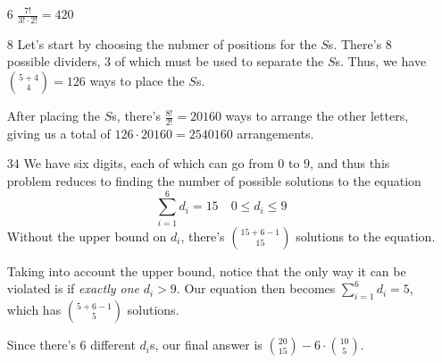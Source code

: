 \documentclass[12pt]{article}
\begin{document}
\begin{enumerate}
    \item[6] $\frac{7!}{3! \cdot 2!}=\boxed{420}$
    \item[8] Let's start by choosing the nubmer of positions for the $S$s.
        There's $8$ possible dividers, $3$ of which must be used to separate the $S$s.
        Thus, we have $\binom{5+4}{4}=126$ ways to place the $S$s.

        After placing the $S$s, there's $\frac{8!}{2!}=20160$ ways to arrange the other letters,
        giving us a total of $126 \cdot 20160 = \boxed{2540160}$ arrangements.

    \item[34] We have six digits, each of which can go from $0$ to $9$, and thus
        this problem reduces to finding the number of possible solutions to the equation
        \[\sum_{i=1}^6 d_i=15 \quad 0 \le d_i \le 9\]
        Without the upper bound on $d_i$, there's $\binom{15+6-1}{15}$ solutions to the equation.

        Taking into account the upper bound, notice that the only way it can be violated
        is if \textit{exactly one} $d_i > 9$.
        Our equation then becomes $\sum_{i=1}^6 d_i=5$, which has $\binom{5+6-1}{5}$ solutions.

        Since there's $6$ different $d_i$s, our final answer is $\boxed{\binom{20}{15}-6 \cdot \binom{10}{5}}$.
        \label{list:count-digits}
\end{enumerate}

\pagebreak
\end{document}
